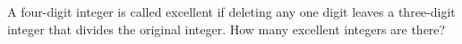 A four-digit integer is called excellent if deleting any one digit leaves a three-digit integer that divides the original integer. How many excellent integers are there?
